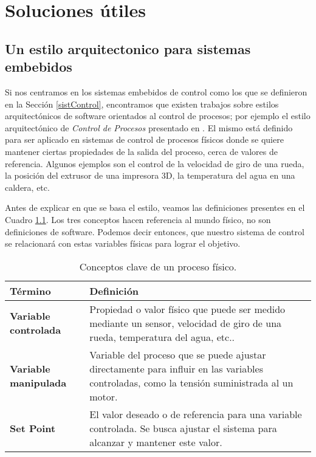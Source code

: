 \chapter{Soluciones útiles}

\section{Un estilo arquitectonico para sistemas embebidos}
\label{arqControlProc}

Si nos centramos en los sistemas embebidos de control como los que se definieron en la Sección \ref{sistControl}, encontramos que existen trabajos sobre estilos arquitectónicos de software orientados al control de procesos; por ejemplo el estilo arquitectónico de \textit{Control de Procesos} presentado en \cite{ShawGarlan1996}. El mismo está definido para ser aplicado en sistemas de control de procesos físicos donde se quiere mantener ciertas propiedades de la salida del proceso, cerca de valores de referencia. Algunos ejemplos son el control de la velocidad de giro de una rueda, la posición del extrusor de una impresora 3D, la temperatura del agua en una caldera, etc.

Antes de explicar en que se basa el estilo, veamos las definiciones presentes en el Cuadro \ref{tab:conceptosArq}. Los tres conceptos hacen referencia al mundo físico, no son definiciones de software. Podemos decir entonces, que nuestro sistema de control se relacionará con estas variables físicas para lograr el objetivo.

\begin{table}[H]

\caption{Conceptos clave de un proceso físico.}
\label{tab:conceptosArq}
\setlength{\extrarowheight}{5pt} %
\renewcommand{\arraystretch}{1.0} %
\begin{tabular}{|>{\raggedright\arraybackslash}p{4.5cm}|>{\raggedright\arraybackslash}p{10.5cm}|}
\hline
\textbf{Término}               & \textbf{Definición}                                                                                                                                       \\ \hline
\textbf{Variable controlada}   & Propiedad o valor físico que puede ser medido mediante un sensor, velocidad de giro de una rueda, temperatura del agua, etc..    \\ \hline
\textbf{Variable manipulada}   & Variable del proceso que se puede ajustar directamente para influir en las variables controladas, como la tensión suministrada al un motor. \\ \hline
\textbf{Set Point}             & El valor deseado o de referencia para una variable controlada. Se busca ajustar el sistema para alcanzar y mantener este valor.                              \\ \hline

\end{tabular}
\end{table}

